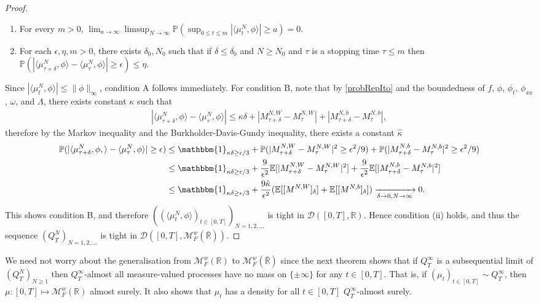 \documentclass{article}
\newcommand{\B}[1]{\mathbb{#1}}
\newcommand{\C}[1]{\mathcal{#1}}
\newcommand{\is}{\mathbbm{1}}
\begin{document}
\begin{proof}
\begin{enumerate}[noitemsep]
        \item[A] For every $m>0$, $\lim_{a\to\infty}\limsup_{N\to\infty}\B{P}(\sup_{0\leq t\leq m}|\langle \mu_t^N,\phi\rangle|\geq a)=0.$
        \item[B] For each $\epsilon, \eta, m>0$, there exists $\delta_0,N_0$ such that if $\delta\leq \delta_0$ and $N\geq N_0$ and $\tau$ is a stopping time $\tau\leq m$ then $\B{P}(|\langle \mu_{\tau+\delta}^N,\phi\rangle - \langle \mu_\tau^N,\phi\rangle |\geq \epsilon)\leq \eta$. 
    \end{enumerate}
    Since $|\langle \mu_t^N,\phi\rangle|\leq \|\phi\|_\infty$, condition A follows immediately. For condition B, note that by \eqref{probRepIto} and the boundedness of $f$, $\phi$, $\phi_t$, $\phi_{xx}$, $\omega$, and $\Lambda$, there exists constant $\kappa$ such that 
    \begin{align*}
        |\langle \mu_{\tau+\delta}^N,\phi\rangle - \langle \mu_\tau^N,\phi\rangle |\leq \kappa\delta + |M^{N,W}_{\tau+\delta}-M^{N,W}_{\tau}|+|M^{N,b}_{\tau+\delta}-M^{N,b}_{\tau}|,
    \end{align*}
    therefore by the Markov inequality and the Burkholder-Davis-Gundy inequality, there exists a constant $\hat{\kappa}$
    \begin{align*}
        \B{P}(|\langle \mu_{\tau+\delta}^N,\phi,\rangle-\langle \mu_\tau^N,\phi\rangle|\geq \epsilon)&\leq \is_{\kappa\delta\geq \epsilon/3}+\B{P}(|M_{\tau+\delta}^{N,W}-M^{N,W}_\tau|^2\geq \epsilon^2/9)+\B{P}(|M_{\tau+\delta}^{N,b}-M_{\tau}^{N,b}|^2\geq \epsilon^2/9)\\
        &\leq \is_{\kappa\delta\geq \epsilon/3}+\frac{9}{\epsilon^2}\B{E}[|M_{\tau+\delta}^{N,W}-M^{N,W}_\tau|^2]+\frac{9}{\epsilon^2}\B{E}[|M_{\tau+\delta}^{N,b}-M^{N,b}_\tau|^2]\\
        &\leq \is_{\kappa\delta \geq \epsilon/3}+\frac{9\hat{\kappa}}{\epsilon^2}(\B{E}[[M^{N,W}]_\delta]+\B{E}[[M^{N,b}]_\delta])\xrightarrow[\delta\to 0,N\to\infty]{}0.
    \end{align*}
    This shows condition B, and therefore $((\langle \mu_t^N,\phi\rangle)_{t\in [0,T]})_{N=1,2,\ldots}$ is tight in $\C{D}([0,T],\B{R})$. Hence condition (ii) holds, and thus the sequence $(Q^N_T)_{N=1,2,\ldots}$ is tight in $\C{D}([0,T],\C{M}^w_F(\bar{\B{R}}))$.
\end{proof}

We need not worry about the generalisation from $\C{M}_F^w(\B{R})$ to $\C{M}_F^w(\bar{\B{R}})$ since the next theorem shows that if $Q^\infty_T$ is a subsequential limit of $(Q^N_T)_{N\geq 1}$ then $Q^\infty_T$-almost all measure-valued processes have no mass on $\{\pm\infty\}$ for any $t\in [0,T]$. That is, if $(\mu_t)_{t\in [0,T]}\sim Q^\infty_T$, then $\mu:[0,T]\mapsto \C{M}_F^w(\B{R})$ almost surely. It also shows that $\mu_t$ has a density for all $t\in [0,T]$ $Q^\infty_T$-almost surely.
\end{document}
